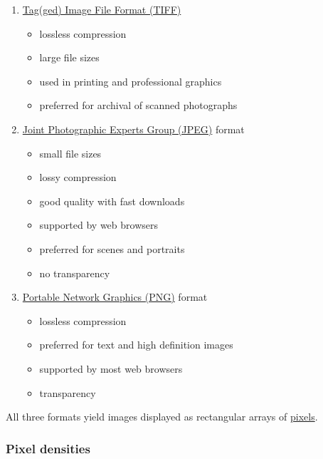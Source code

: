 \documentclass[
  11pt,
  british,
  a4paper,
]{article}
\providecommand{\tightlist}{%
  \setlength{\itemsep}{0pt}\setlength{\parskip}{0pt}}
\begin{document}
\begin{enumerate}
\tightlist
\item
  \href{https://en.wikipedia.org/wiki/TIFF}{Tag(ged) Image File Format
  (TIFF)}

  \begin{itemize}
  \tightlist
  \item
    lossless compression
  \item
    large file sizes
  \item
    used in printing and professional graphics
  \item
    preferred for archival of scanned photographs
  \end{itemize}
\item
  \href{https://jpeg.org/about.html}{Joint Photographic Experts Group
  (JPEG)} format

  \begin{itemize}
  \tightlist
  \item
    small file sizes
  \item
    lossy compression
  \item
    good quality with fast downloads
  \item
    supported by web browsers
  \item
    preferred for scenes and portraits
  \item
    no transparency
  \end{itemize}
\item
  \href{http://www.libpng.org/pub/png/}{Portable Network Graphics (PNG)}
  format

  \begin{itemize}
  \tightlist
  \item
    lossless compression
  \item
    preferred for text and high definition images
  \item
    supported by most web browsers
  \item
    transparency
  \end{itemize}
\end{enumerate}

All three formats yield images displayed as rectangular arrays of
\href{https://en.wikipedia.org/wiki/Pixels}{pixels}.

\hypertarget{pixel-densities}{%
\subsubsection{Pixel densities}\label{pixel-densities}}
\end{document}
